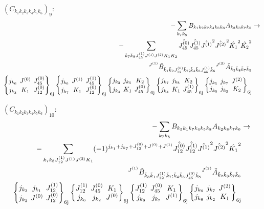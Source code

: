 \documentclass[11pt]{article}
\newcommand{\sixj}[6]{\begingroup\setlength{\arraycolsep}{0.2em}\begin{Bmatrix} #1 & #2 & #3 \\ #4 & #5 & #6 \end{Bmatrix}_{\text{6j}}\endgroup}
\begin{document}
$\left({C}_{{k}_{1}{k}_{2}{k}_{3}{k}_{4}{k}_{5}{k}_{6}}\right)_{9}$:
\begin{align}
-\sum_{{k}_{7}{k}_{8}}{B}_{{k}_{1}{k}_{2}{k}_{7}{k}_{4}{k}_{8}{k}_{6}}{A}_{{k}_{3}{k}_{8}{k}_{7}{k}_{5}}&\rightarrow \notag \\-\sum_{\tilde{k}_{7}\tilde{k}_{8}J^{(1)}_{45}J^{(1)}J^{(2)}K_{1}K_{2}}\hat{J^{(0)}_{45}}\hat{J^{(1)}_{45}}\hat{J^{(1)}}^{2}\hat{J^{(2)}}^{2}\hat{K_{1}}^{2}\hat{K_{2}}^{2}& \notag \\{}^{J^{(1)}}\tilde{B}_{\tilde{k}_{1}\tilde{k}_{2}J^{(0)}_{12}\tilde{k}_{7};\tilde{k}_{4}\tilde{k}_{8}J^{(1)}_{45}\tilde{k}_{6}}{}^{J^{(2)}}\tilde{A}_{\tilde{k}_{3}\tilde{k}_{8}\tilde{k}_{7}\tilde{k}_{5}}& \notag \\\sixj{j_{{k}_{6}}}{J^{(0)}}{J^{(0)}_{45}}{j_{{k}_{3}}}{K_{1}}{J^{(0)}_{12}}\sixj{j_{{k}_{6}}}{J^{(1)}}{J^{(1)}_{45}}{j_{{k}_{7}}}{K_{1}}{J^{(0)}_{12}}\sixj{j_{{k}_{3}}}{j_{{k}_{5}}}{K_{2}}{j_{{k}_{4}}}{K_{1}}{J^{(0)}_{45}}\sixj{j_{{k}_{7}}}{j_{{k}_{8}}}{K_{2}}{j_{{k}_{4}}}{K_{1}}{J^{(1)}_{45}}\sixj{j_{{k}_{5}}}{j_{{k}_{7}}}{J^{(2)}}{j_{{k}_{8}}}{j_{{k}_{3}}}{K_{2}}
\end{align}

$\left({C}_{{k}_{1}{k}_{2}{k}_{3}{k}_{4}{k}_{5}{k}_{6}}\right)_{10}$:
\begin{align}
-\sum_{{k}_{7}{k}_{8}}{B}_{{k}_{3}{k}_{1}{k}_{7}{k}_{4}{k}_{5}{k}_{8}}{A}_{{k}_{2}{k}_{8}{k}_{7}{k}_{6}}&\rightarrow \notag \\-\sum_{\tilde{k}_{7}\tilde{k}_{8}J^{(1)}_{12}J^{(1)}J^{(2)}K_{1}}(-1)^{j_{{k}_{1}} +j_{{k}_{7}} +J^{(0)}_{12} +J^{(0)} +J^{(1)} }\hat{J^{(0)}_{12}}\hat{J^{(1)}_{12}}\hat{J^{(1)}}^{2}\hat{J^{(2)}}^{2}\hat{K_{1}}^{2}& \notag \\{}^{J^{(1)}}\tilde{B}_{\tilde{k}_{3}\tilde{k}_{1}J^{(1)}_{12}\tilde{k}_{7};\tilde{k}_{4}\tilde{k}_{5}J^{(0)}_{45}\tilde{k}_{8}}{}^{J^{(2)}}\tilde{A}_{\tilde{k}_{2}\tilde{k}_{8}\tilde{k}_{7}\tilde{k}_{6}}& \notag \\\sixj{j_{{k}_{3}}}{j_{{k}_{1}}}{J^{(1)}_{12}}{j_{{k}_{2}}}{J^{(0)}}{J^{(0)}_{12}}\sixj{J^{(1)}_{12}}{J^{(0)}_{45}}{K_{1}}{j_{{k}_{6}}}{j_{{k}_{2}}}{J^{(0)}}\sixj{J^{(1)}_{12}}{J^{(0)}_{45}}{K_{1}}{j_{{k}_{8}}}{j_{{k}_{7}}}{J^{(1)}}\sixj{j_{{k}_{6}}}{j_{{k}_{7}}}{J^{(2)}}{j_{{k}_{8}}}{j_{{k}_{2}}}{K_{1}}
\end{align}
\end{document}
